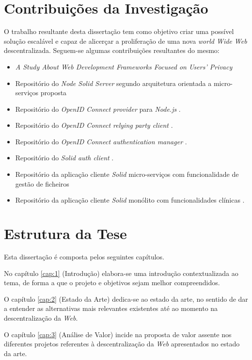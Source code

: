\section{Contribuições da Investigação \label{section_contribuicoes_investigacao}}
O trabalho resultante desta dissertação tem como objetivo criar uma possível solução escalável e capaz de alicerçar a proliferação de uma nova \emph{world Wide Web} descentralizada. Seguem-se algumas contribuições resultantes do mesmo:
\begin{itemize}
    \item \emph{A Study About Web Development Frameworks Focused on Users’ Privacy} \cite{solid_article}
    \item Repositório do \emph{Node Solid Server} segundo arquitetura orientada a micro-serviços proposta \cite{repo_node_solid_server}
    \item Repositório do \emph{OpenID Connect provider} para \emph{Node.js} \cite{repo_oidc_op}.
    \item Repositório do \emph{OpenID Connect relying party client} \cite{repo_oidc_rp}.
    \item Repositório do \emph{OpenID Connect authentication manager} \cite{repo_oidc_auth_manager}.
    \item Repositório do \emph{Solid auth client} \cite{repo_solid_auth_client}.
    \item Repositório da aplicação cliente \emph{Solid} micro-serviços com funcionalidade de gestão de ficheiros \cite{repo_solid_filemanager}
    \item Repositório da aplicação cliente \emph{Solid} monólito com funcionalidades clínicas \cite{repo_steve_clinic}.
\end{itemize}

\section{Estrutura da Tese}

Esta dissertação é composta pelos seguintes capítulos.

No capítulo \ref{cap:1} (Introdução) elabora-se uma introdução contextualizada ao tema, de forma a que o projeto e objetivos sejam melhor compreendidos.

O capítulo \ref{cap:2} (Estado da Arte) dedica-se ao estado da arte, no sentido de dar a entender as alternativas mais relevantes existentes até ao momento na descentralização da \emph{Web}.

O capítulo \ref{cap:3} (Análise de Valor) incide na proposta de valor assente nos diferentes projetos referentes à descentralização da \emph{Web} apresentados no estado da arte.

